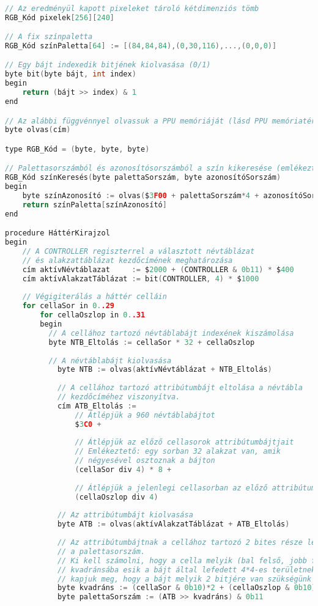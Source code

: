 \begin{lstlisting}[backgroundcolor = \color{white}, language=c, basicstyle=\scriptsize]

// Az eredményül kapott pixeleket tároló kétdimenziós tömb
RGB_Kód pixelek[256][240]

// A fix színpaletta
RGB_Kód színPaletta[64] := [(84,84,84),(0,30,116),...,(0,0,0)]

// Egy bájt indexedik bitjének kiolvasása (0/1)
byte bit(byte bájt, int index)
begin
	return (bájt >> index) & 1
end

// Az alábbi függvénnyel olvassuk a PPU memóriáját (lásd PPU memóriatérkép)
byte olvas(cím)

type RGB_Kód = (byte, byte, byte)

// Palettasorszámból és azonosítósorszámból a szín kikeresése (emlékeztető: $3F00 a paletta index kezdőcíme)
RGB_Kód színKeresés(byte palettaSorszám, byte azonosítóSorszám)
begin
	byte színAzonosító := olvas($3F00 + palettaSorszám*4 + azonosítóSorszám)
	return színPaletta[színAzonosító]
end

procedure HáttérKirajzol
begin
	// A CONTROLLER regiszterrel a választott névtáblázat
	// és alakzattáblázat kezdőcímének meghatározása
	cím aktívNévtáblazat     := $2000 + (CONTROLLER & 0b11) * $400
	cím aktívAlakzatTáblázat := bit(CONTROLLER, 4) * $1000
	
	// Végigiterálás a háttér celláin
	for cellaSor in 0..29
		for cellaOszlop in 0..31
		begin
		  // A cellához tartozó névtáblabájt indexének kiszámolása
		  byte NTB_Eltolás := cellaSor * 32 + cellaOszlop 
		  
		  // A névtáblabájt kiolvasása
			byte NTB := olvas(aktívNévtáblázat + NTB_Eltolás)
			
			// A cellához tartozó attribútumbájt eltolása a névtábla
			// kezdőcíméhez viszonyítva.
			cím ATB_Eltolás := 
				// Átlépjük a 960 névtáblabájtot 
				$3C0 +		
								
				// Átlépjük az előző cellasorok attribútumbájtjait
				// Emlékeztető: egy sorban 32 alakzat van, amik 
				// négyesével osztoznak a bájton
				(cellaSor div 4) * 8 + 	
					
				// Átlépjük a jelenlegi cellasorban az előző attribútumbájtokat
				(cellaOszlop div 4)         
				
			// Az attribútumbájt kiolvasása
			byte ATB := olvas(aktívAlakzatTáblázat + ATB_Eltolás)
			
			// Az attribútumbájtnak a cellához tartozó 2 bites része lesz
			// a palettasorszám.
			// Ki kell számolni, hogy a cella melyik (bal felső, jobb felső, stb.)
			// kvadránsába esik a bájt által lefedett 4*4-es területnek, ugyanis így
			// kapjuk meg, hogy a bájt melyik 2 bitjére van szükségünk
			byte kvadráns := (cellaSor & 0b10)*2 + (cellaOszlop & 0b10) 
			byte palettaSorszám := (ATB >> kvadráns) & 0b11
				

\end{lstlisting}
